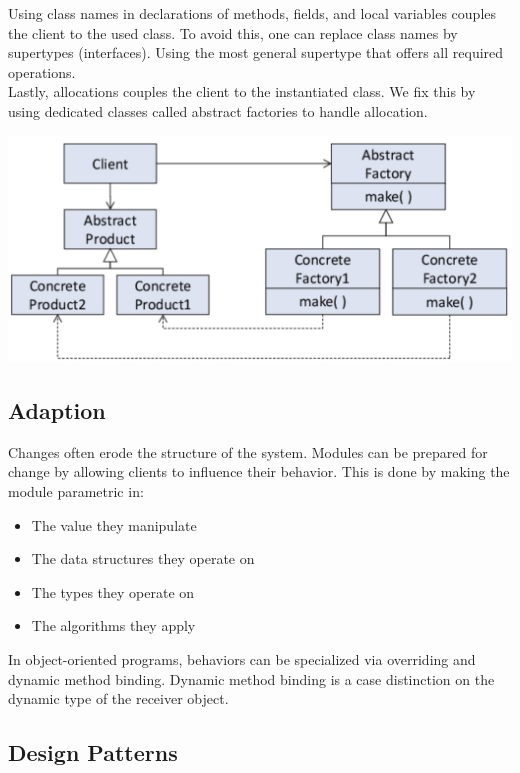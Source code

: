 Using class names in declarations of methods, fields, and local variables couples the client to the used class. To avoid this, one can replace class names by supertypes (interfaces). Using the most general supertype that offers all required operations. \\

Lastly, allocations couples the client to the instantiated class. We fix this by using dedicated classes called abstract factories to handle allocation. 

\begin{center}
	\includegraphics[width=0.7\columnwidth]{assets/factory}
\end{center}


\subsection{Adaption}

Changes often erode the structure of the system. Modules can be prepared for change by allowing clients to influence their behavior. This is done by making the module parametric in:
\begin{itemize}
	\item The value they manipulate
	\item The data structures they operate on
	\item The types they operate on
	\item The algorithms they apply
\end{itemize}

In object-oriented programs, behaviors can be specialized via overriding and dynamic method binding. Dynamic method binding is a case distinction on the dynamic type of the receiver object.


\subsection{Design Patterns}

